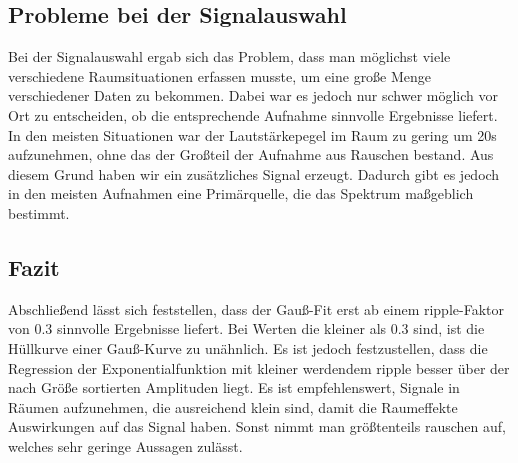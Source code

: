 \subsection{Probleme bei der Signalauswahl}
Bei der Signalauswahl ergab sich das Problem, dass man möglichst viele verschiedene Raumsituationen erfassen musste, um eine große Menge verschiedener Daten zu bekommen. Dabei war es jedoch nur schwer möglich vor Ort zu entscheiden, ob die entsprechende Aufnahme sinnvolle Ergebnisse liefert.
In den meisten Situationen war der Lautstärkepegel im Raum zu gering um 20s aufzunehmen, ohne das der Großteil der Aufnahme aus Rauschen bestand. Aus diesem Grund haben wir ein zusätzliches Signal erzeugt. Dadurch gibt es jedoch in den meisten Aufnahmen eine Primärquelle, die das Spektrum maßgeblich bestimmt.

\subsection{Fazit}
Abschließend lässt sich feststellen, dass der Gauß-Fit erst ab einem ripple-Faktor von 0.3 sinnvolle Ergebnisse liefert. Bei Werten die kleiner als 0.3 sind, ist die Hüllkurve einer Gauß-Kurve zu unähnlich. Es ist jedoch festzustellen, dass die Regression der Exponentialfunktion mit kleiner werdendem ripple besser über der nach Größe sortierten Amplituden liegt.
Es ist empfehlenswert, Signale in Räumen aufzunehmen, die ausreichend klein sind, damit die Raumeffekte Auswirkungen auf das Signal haben. Sonst nimmt man größtenteils rauschen auf, welches sehr geringe Aussagen zulässt.
 
